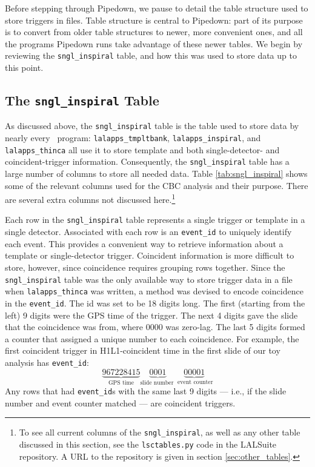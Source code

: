 Before stepping through Pipedown, we pause to detail the table structure used
to store triggers in files. Table structure is central to Pipedown: part of its
purpose is to convert from older table structures to newer, more convenient
ones, and all the programs Pipedown runs take advantage of these newer tables.
We begin by reviewing the \texttt{sngl\_inspiral} table, and how this was used
to store data up to this point.

\subsection{The \texttt{sngl\_inspiral} Table}

As discussed above, the \texttt{sngl\_inspiral} table is the table used to
store data by nearly every \hipe~program: \texttt{lalapps\_tmpltbank},
\texttt{lalapps\_inspiral}, and \texttt{lalapps\_thinca} all use it to store
template and both single-detector- and coincident-trigger information.
Consequently, the \texttt{sngl\_inspiral} table has a large number of columns
to store all needed data. Table \ref{tab:sngl_inspiral} shows some of the
relevant columns used for the \ac{CBC} analysis and their purpose. There are
several extra columns not discussed here.\footnote{To see all current columns
of the \texttt{sngl\_inspiral}, as well as any other table discussed in this
section, see the \texttt{lsctables.py} code in the LALSuite repository. A URL
to the repository is given in section \ref{sec:other_tables}.}

Each row in the \texttt{sngl\_inspiral} table represents a single trigger or
template in a single detector. Associated with each row is an
\texttt{event\_id} to uniquely identify each event. This provides a convenient
way to retrieve information about a template or single-detector trigger.
Coincident information is more difficult to store, however, since coincidence
requires grouping rows together. Since the \texttt{sngl\_inspiral} table was
the only available way to store trigger data in a file when
\texttt{lalapps\_thinca} was written, a method was devised to encode
coincidence in the \texttt{event\_id}. The id was set to be 18 digits long. The
first (starting from the left) 9 digits were the GPS time of the trigger. The
next 4 digits gave the slide that the coincidence was from, where $0000$ was
zero-lag. The last 5 digits formed a counter that assigned a unique number to
each coincidence. For example, the first coincident trigger in H1L1-coincident
time in the first slide of our toy analysis has \texttt{event\_id}:
\begin{equation*}
\underbrace{967228415}_{\text{GPS time}}\underbrace{0001}_{\text{slide number~}}\underbrace{00001}_{\text{~event counter}}
\end{equation*}
Any rows that had \texttt{event\_id}s with the same last 9 digits --- i.e., if
the slide number and event counter matched --- are coincident triggers.

